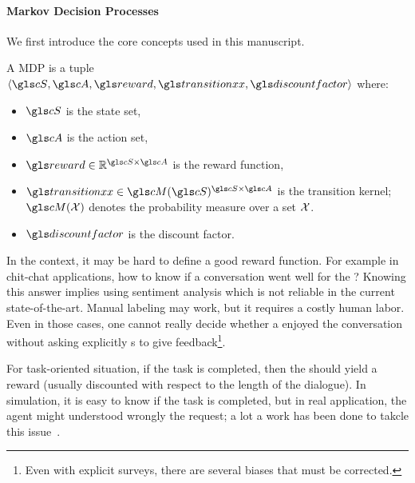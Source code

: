 \paragraph{Markov Decision Processes}

We first introduce the core concepts used in this manuscript.

\begin{definition}
    A \acrfull{MDP} is a tuple $\langle{}\cS,\cA,\reward,\transition,\discountfactor\rangle{}$ where:
    \begin{itemize}
        \item  $\cS$ is the state set,
        \item  $\cA$ is the action set,
        \item $\reward\in\Real^{\cS \times \cA}$ is the reward function,
        \item $\transition\in \cM(\cS)^{\cS \times \cA}$ is the transition kernel; $\cM(\cX)$ denotes the probability measure over a set $\mathcal{X}$.
        \item $\discountfactor$ is the discount factor.
    \end{itemize}
    \label{def:mdp}
\end{definition}

In the  context, it may be hard to define a good reward function. For example in chit-chat applications, how to know if a conversation went well for the ? Knowing this answer implies using sentiment analysis which is not reliable in the current state-of-the-art. Manual labeling may work, but it requires a costly human labor. Even in those cases, one cannot really decide whether a  enjoyed the conversation without asking explicitly s to give feedback\footnote{Even with explicit surveys, there are several biases that must be corrected.}.

For task-oriented situation, if the task is completed, then the  should yield a reward (usually discounted with respect to the length of the dialogue). In simulation, it is easy to know if the task is completed, but in real application, the agent might understood wrongly the request; a lot a work has been done to takcle this issue~\parencite{elasri2016}.

